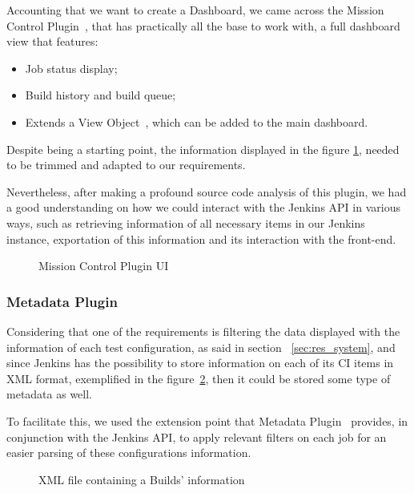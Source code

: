 Accounting that we want to create a Dashboard, we came across the Mission Control Plugin~\cite{jkns:missionC}, that has practically all the base to work with, a full dashboard view that features:

\begin{itemize}
\item Job status display;
\item Build history and build queue;
\item Extends a View Object~\cite{jnks:ViewObj}, which can be added to the main dashboard.
\end{itemize}

Despite being a starting point, the information displayed in the figure \ref{fig:missionControl}, needed to be trimmed and adapted to our requirements. 

Nevertheless, after making a profound source code analysis of this plugin, we had a good understanding on how we could interact with the Jenkins API in various ways, such as retrieving information of all necessary items in our Jenkins instance, exportation of this information and its interaction with the front-end.

  \begin{figure}[H]
  \centering
      \caption{Mission Control Plugin UI}
      \label{fig:missionControl}
  \end{figure}

\subsubsection{Metadata Plugin}\label{metadata_plugin}

Considering that one of the requirements is filtering the data displayed with the information of each test configuration, as said in section ~\ref{sec:res_system}, and since Jenkins has the possibility to store information on each of its CI items in XML format, exemplified in the figure~\ref{fig:buildXML}, then it could be stored some type of metadata as well.

To facilitate this, we used the extension point that Metadata Plugin~\cite{jkns:metadata} provides, in conjunction with the Jenkins API, to apply relevant filters on each job for an easier parsing of these configurations information.

  \begin{figure}[H]
  \centering
      \caption{XML file containing a Builds' information}
      \label{fig:buildXML}
  \end{figure}
  
